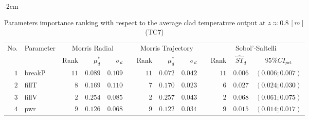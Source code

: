 \begin{table*}[!htbp]\centering
{}
\begin{adjustwidth*}{}{-2cm}
\caption{Parameters importance ranking with respect to the average clad temperature output at $z \approx 0.8 \, [m]$ (TC$7$)}
\label{tab:app_screening_tc7_average}
\begin{tabular}{@{}rlrrrrrrrrrcc@{}}\toprule
\multirow{2}{*}{\footnotesize{No.}} & \multirow{2}{*}{\footnotesize{Parameter}} & \multicolumn{3}{c}{\footnotesize{Morris Radial}} & \phantom{a} & \multicolumn{3}{c}{\footnotesize{Morris Trajectory}}  &\phantom{a}& \multicolumn{3}{c}{\footnotesize{Sobol'-Saltelli}}                               \\             
                                                                                  \cmidrule{3-5}                                                   \cmidrule{7-9}                                                      \cmidrule{11-13}
                                    &                                           & \footnotesize{Rank}   & $\mu^*_d$ & $\sigma_d$   &             & \footnotesize{Rank} & $\mu^*_d$ & $\sigma_d$          &           & \footnotesize{Rank} & \footnotesize{$\hat{ST}_d$} & \footnotesize{$95\%CI_{pct}$}\\ \midrule
\footnotesize{$1 $} & \footnotesize{breakP   } & \footnotesize{$11$} & \footnotesize{$0.089$} & \footnotesize{$0.109$} && \footnotesize{$11$} & \footnotesize{$0.072$} & \footnotesize{$0.042$} && \footnotesize{$11$} & \footnotesize{$0.006$} & \footnotesize{$(0.006;0.007)$} \\
\footnotesize{$2 $} & \footnotesize{fillT    } & \footnotesize{$8 $} & \footnotesize{$0.169$} & \footnotesize{$0.110$} && \footnotesize{$7 $} & \footnotesize{$0.170$} & \footnotesize{$0.023$} && \footnotesize{$6 $} & \footnotesize{$0.027$} & \footnotesize{$(0.024;0.030)$} \\
\footnotesize{$3 $} & \footnotesize{fillV    } & \footnotesize{$2 $} & \footnotesize{$0.254$} & \footnotesize{$0.085$} && \footnotesize{$2 $} & \footnotesize{$0.257$} & \footnotesize{$0.043$} && \footnotesize{$2 $} & \footnotesize{$0.068$} & \footnotesize{$(0.061;0.075)$} \\
\footnotesize{$4 $} & \footnotesize{pwr      } & \footnotesize{$9 $} & \footnotesize{$0.126$} & \footnotesize{$0.068$} && \footnotesize{$9 $} & \footnotesize{$0.122$} & \footnotesize{$0.034$} && \footnotesize{$9 $} & \footnotesize{$0.015$} & \footnotesize{$(0.014;0.017)$} \\

\end{tabular}
\end{adjustwidth*}
\end{table*}
